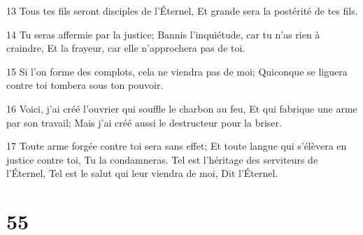 \par 13 Tous tes fils seront disciples de l'Éternel, Et grande sera la postérité de tes fils.
\par 14 Tu seras affermie par la justice; Bannis l'inquiétude, car tu n'as rien à craindre, Et la frayeur, car elle n'approchera pas de toi.
\par 15 Si l'on forme des complots, cela ne viendra pas de moi; Quiconque se liguera contre toi tombera sous ton pouvoir.
\par 16 Voici, j'ai créé l'ouvrier qui souffle le charbon au feu, Et qui fabrique une arme par son travail; Mais j'ai créé aussi le destructeur pour la briser.
\par 17 Toute arme forgée contre toi sera sans effet; Et toute langue qui s'élèvera en justice contre toi, Tu la condamneras. Tel est l'héritage des serviteurs de l'Éternel, Tel est le salut qui leur viendra de moi, Dit l'Éternel.

\chapter{55}

